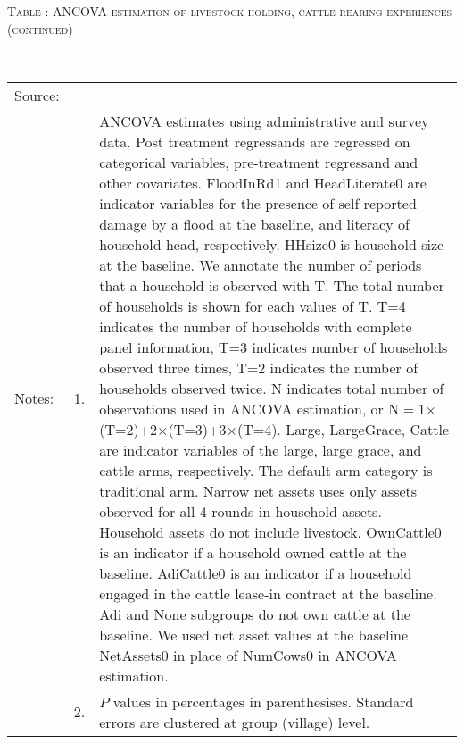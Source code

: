 \vspace{-1cm}\hspace{-1cm}\begin{minipage}[t]{14cm}
\hfil\textsc{\normalsize Table \thetable: ANCOVA estimation of livestock holding, cattle rearing experiences (continued)\label{tab ANCOVA net assets experience 2}}\\
\setlength{\tabcolsep}{1pt}
\setlength{\baselineskip}{8pt}
\renewcommand{\arraystretch}{.52}
\hfil{}\\
\renewcommand{\arraystretch}{.8}
\setlength{\tabcolsep}{1pt}
\begin{tabular}{>{\hfill\scriptsize}p{1cm}<{}>{\hfill\scriptsize}p{.25cm}<{}>{\scriptsize}p{12cm}<{\hfill}}
Source:& \multicolumn{2}{l}{\scriptsize Estimated with GUK administrative and survey data.}\\
Notes: & 1. & ANCOVA estimates using administrative and survey data. Post treatment regressands are regressed on categorical variables, pre-treatment regressand and other covariates. \textsf{FloodInRd1} and \textsf{HeadLiterate0} are indicator variables for the presence of self reported damage by a flood at the baseline, and literacy of household head, respectively. \textsf{HHsize0} is household size at the baseline. We annotate the number of periods that a household is observed with \textsf{T}. The total number of households is shown for each values of \textsf{T}. \textsf{T=4} indicates the number of households with complete panel information, \textsf{T=3} indicates number of households observed three times, \textsf{T=2} indicates the number of households observed twice. \textsf{N} indicates total number of observations used in ANCOVA estimation, or \textsf{N$=$1$\times$(T=2)+2$\times$(T=3)+3$\times$(T=4)}.  \textsf{Large}, \textsf{LargeGrace}, \textsf{Cattle} are indicator variables of the \textsf{large}, \textsf{large grace}, and \textsf{cattle} arms, respectively. The default arm category is \textsf{traditional} arm. Narrow net assets uses only assets observed for all 4 rounds in household assets. Household assets do not include livestock. \textsf{OwnCattle0} is an indicator if a household owned cattle at the baseline. \textsf{AdiCattle0} is an indicator if a household engaged in the cattle lease-in contract at the baseline.  \textsf{Adi} and \textsf{None} subgroups do not own cattle at the baseline. We used net asset values at the baseline \textsf{NetAssets0} in place of \textsf{NumCows0} in ANCOVA estimation. \\
& 2. & $P$ values in percentages in parenthesises. Standard errors are clustered at group (village) level.
\end{tabular}
\end{minipage}



